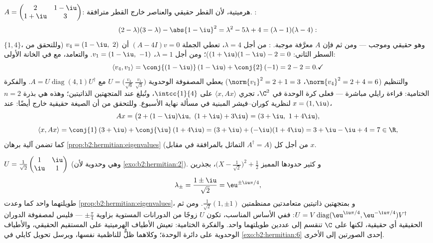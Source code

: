 \begin{example}\label{ex:b2:hermitian:pdrun}
$A = \begin{pmatrix} 2 & 1-\iu\\ 1+\iu & 3\end{pmatrix}$:
هرميتية، لأن القطر حقيقي والعناصر خارج القطر
مترافقة. :
\[
(2-\lambda)(3-\lambda) - \abs{1-\iu}^2
= \lambda^2 - 5\lambda + 4
= (\lambda - 1)(\lambda - 4) :
\]
 $\{1, 4\}$، وهو حقيقي وموجب --- ومن ثم فإن $A$ معرَّفة
موجبة. : من أجل $\lambda = 4$، تعطي الجملة $(A -
4I)v = 0$ أن $v_4 = (1 - \iu,\ 2)$ (وللتحقق من السطر الثاني:
$(1+\iu)(1-\iu) - 2 = 0$)؛ ومن أجل $\lambda = 1$، $v_1 = (1 - \iu,\
-1)$. والتعامد، مع  في الخانة الأولى:
\[
\langle v_4, v_1\rangle
= \conj{(1-\iu)}\,(1-\iu) + \conj{2}\,(-1)
= 2 - 2 = 0 . \checkmark
\]
والتنظيم ($\norm{v_4}^2 = 2 + 4 = 6$، $\norm{v_1}^2 = 2 + 1
= 3$) يعطي المصفوفة الوحدوية $U = \bigl(\frac{v_4}{\sqrt6}\
\frac{v_1}{\sqrt3}\bigr)$ مع $A =
U\operatorname{diag}(4,1)U^\dagger$. والفكرة الختامية:
قراءة رايلي مباشرة --- فعلى كرة الوحدة في
$\C^2$، تجري $\langle x, Ax\rangle$ على $\intcc{1}{4}$،
وتُبلغ عند المتجهتين الذاتيتين؛ وهذه هي بذرة $n = 2$
لنظرية كوران--فيشر المبنية في مسألة نهاية الأسبوع.
وللتحقق من أن الصيغة حقيقية خارج  أيضًا: عند
$x = (1, \iu)$،
\[
Ax = \bigl(2 + (1-\iu)\iu,\ (1+\iu) + 3\iu\bigr)
= (3 + \iu,\ 1 + 4\iu),
\]
\[
\langle x, Ax\rangle = \conj{1}\,(3+\iu) +
\conj{\iu}\,(1+4\iu)
= (3 + \iu) + (-\iu)(1 + 4\iu) = 3 + \iu - \iu + 4 = 7 \in
\R ,
\]
كما تضمن آلية برهان \cref{prop:b2:hermitian:eigenvalues}
(التماثل بالمرافقة في مقابل $A^\dagger = A$) من أجل
كل $x$.
\end{example}

\begin{example}\label{ex:b2:hermitian:unitary}
$U = \frac{1}{\sqrt2}\begin{pmatrix} 1 & \iu\\ \iu & 1
\end{pmatrix}$ (وهي وحدوية لأن \cref{exo:b2:hermitian:2}). و
كثير حدودها المميز $\bigl(X - \frac{1}{\sqrt2}\bigr)^2
+ \frac12$، بجذرين
\[
\lambda_\pm = \frac{1 \pm \iu}{\sqrt2} = \eu^{\pm\iu\pi/4},
\]
طويلتهما واحد كما وعدت \cref{prop:b2:hermitian:eigenvalues}، و
بمتجهتين ذاتيتين متعامدتين ممنظمتين $\frac{1}{\sqrt2}(1, \pm1)$. ومن ثم $U =
V\operatorname{diag}(\eu^{\iu\pi/4},
\eu^{-\iu\pi/4})V^\dagger$: ففي الأساس المناسب، تكون $U$ زوجًا من
الدورانات المستوية بزاوية $\pm\frac\pi4$ --- فليس لمصفوفة الدوران الحقيقية
أي \omterm{def:b2:reduction:eigen}{متجهة ذاتية} حقيقية، لكنها على $\C$ تنقسم إلى
عددين طويلتهما واحد. والفكرة الختامية: تعيش الأطياف الهرميتية على
المستقيم الحقيقي، والأطياف الوحدوية على دائرة الوحدة؛ وكلاهما
ظلٌّ للناظمية نفسها، ويرسل تحويل كايلي في
\cref{exo:b2:hermitian:6} إحدى الصورتين إلى الأخرى.
\end{example}

